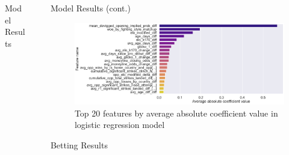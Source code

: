 \documentclass[final]{beamer}
\newlength{\sepwidth}
\newlength{\colwidth}
\newcommand{\separatorcolumn}{\begin{column}{\sepwidth}\end{column}}
\begin{document}
\begin{frame}[t]
\begin{columns}[t]
\begin{column}{\colwidth}
\begin{block}{Model Results}
  \end{block}

\end{column}

\separatorcolumn

\begin{column}{\colwidth}

  \begin{block}{Model Results (cont.)}

    \begin{figure}
        \centering
        \includegraphics[width=0.65\linewidth]{figures/lr_feature_avg_abs_coef.png}
        \caption{Top 20 features by average absolute coefficient value in logistic regression model}
    \end{figure}
    

  \end{block}
     \vspace{-30pt}
  \begin{block}{Betting Results}


\end{block}
\end{column}
\end{columns}
\end{frame}
\end{document}
